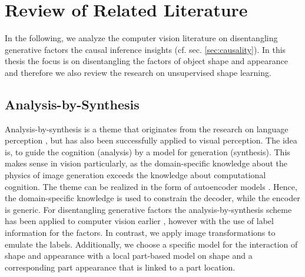 \chapter{Review of Related Literature}\label{sec:literature}
	In the following, we analyze the computer vision literature on disentangling generative factors \wrt the causal inference insights (cf. sec. \ref{sec:causality}).
	In this thesis the focus is on disentangling the factors of object shape and appearance and therefore we also review the research on unsupervised shape learning.


\section{Analysis-by-Synthesis}
	Analysis-by-synthesis is a theme that originates from the research on language perception \eg \cite{bever10anabysyn}, but has also been successfully applied to visual perception.
	The idea is, to guide the cognition (analysis) by a model for generation (synthesis). This makes sense in vision particularly, as the domain-specific knowledge about the physics of image generation exceeds the knowledge about computational cognition.
	The theme can be realized in the form of autoencoder models \cite{tieleman14thesis}.
	Hence, the domain-specific knowledge is used to constrain the decoder, while the encoder is generic.
	For disentangling generative factors the analysis-by-synthesis scheme has been applied to computer vision earlier \cite{kulkarni15dcign, yildirim15anabysyn, desjardins12genentangle}, however with the use of label information for the factors.
	In contrast, we apply image transformations to emulate the labels.
	Additionally, we choose a specific model for the interaction of shape and appearance with a local part-based model on shape and a corresponding part appearance that is linked to a part location.



